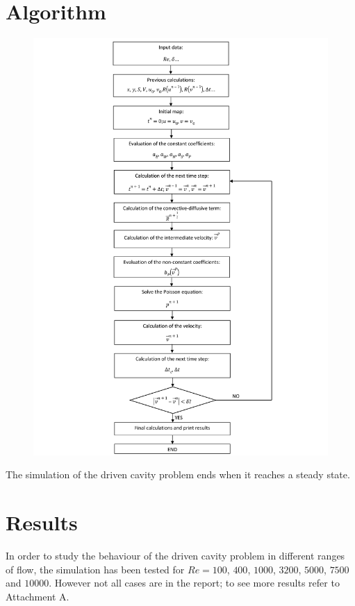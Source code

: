 \section{Algorithm}
\label{AlgorithmDriven}
\begin{figure}[H]
	\centering
	\includegraphics[scale=0.169]{DrivenCavity/algorithm}
\end{figure}
The simulation of the driven cavity problem ends when it reaches a steady state.

\section{Results}
In order to study the behaviour of the driven cavity problem in different ranges of flow, the simulation has been tested for $Re=100$, $400$, $1000$, $3200$, $5000$, $7500$ and $10000$. However not all cases are in the report; to see more results refer to Attachment A.

